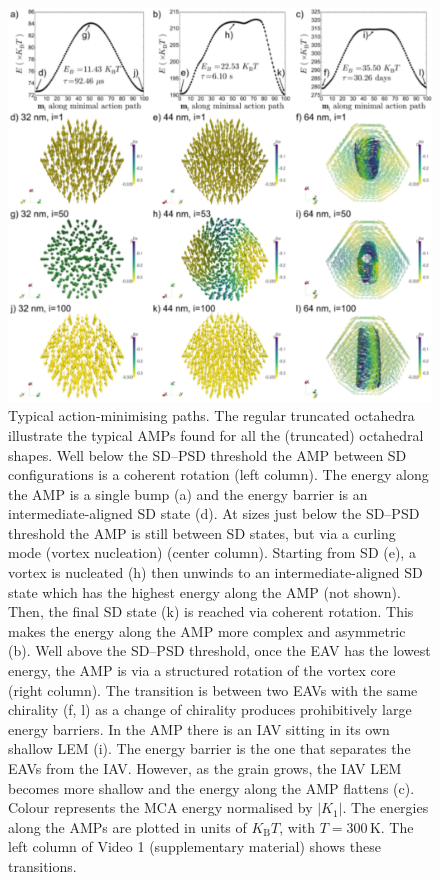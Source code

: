 \begin{figure}
\centering
\includegraphics[width=\textwidth]{research-1/figs/Figure_07.pdf}
\caption[Typical action-minimising paths]{Typical action-minimising paths. The regular truncated octahedra illustrate the typical AMPs found for all the (truncated) octahedral shapes. Well below the SD--PSD threshold the AMP between SD configurations is a coherent rotation (left column). The energy along the AMP is a single bump (a) and the energy barrier is an intermediate-aligned SD state (d). At sizes just below the SD--PSD threshold the AMP is still between SD states, but via a curling mode (vortex nucleation) (center column). Starting from SD (e), a vortex is nucleated (h) then unwinds to an intermediate-aligned SD state which has the highest energy along the AMP (not shown). Then, the final SD state (k) is reached via coherent rotation. This makes the energy along the AMP more complex and asymmetric (b). Well above the SD--PSD threshold, once the EAV has the lowest energy, the AMP is via a structured rotation of the vortex core (right column). The transition is between two EAVs with the same chirality (f, l) as a change of chirality produces prohibitively large energy barriers. In the AMP there is an IAV sitting in its own shallow LEM (i). The energy barrier is the one that separates the EAVs from the IAV. However, as the grain grows, the IAV LEM becomes more shallow and the energy along the AMP flattens (c). Colour represents the MCA energy normalised by $|K_1|$. The energies along the AMPs are plotted in units of $K_\text{B}T$, with $T=300\,\text{K}$. The left column of Video 1 (supplementary material) shows these transitions.}
\label{fig7}
\end{figure}

